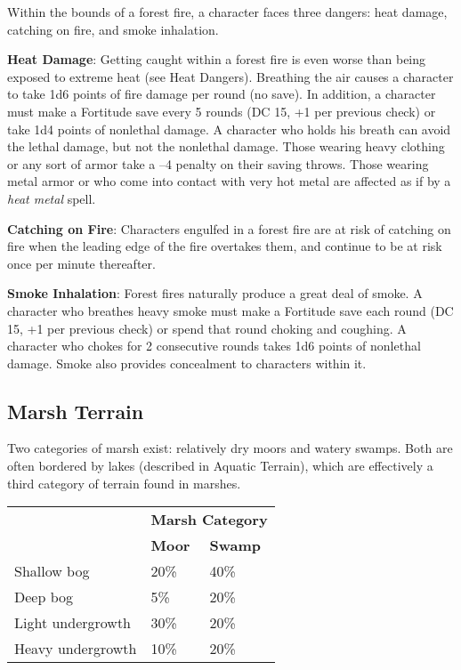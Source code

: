Within the bounds of a forest fire, a character faces three dangers: heat damage, catching on fire, and smoke inhalation. 
				
\textbf{Heat Damage}: Getting caught within a forest fire is even worse than being exposed to extreme heat (see Heat Dangers). Breathing the air causes a character to take 1d6 points of fire damage per round (no save). In addition, a character must make a Fortitude save every 5 rounds (DC 15, +1 per previous check) or take 1d4 points of nonlethal damage. A character who holds his breath can avoid the lethal damage, but not the nonlethal damage. Those wearing heavy clothing or any sort of armor take a --4 penalty on their saving throws. Those wearing metal armor or who come into contact with very hot metal are affected as if by a \textit{heat metal }spell.
				
\textbf{Catching on Fire}: Characters engulfed in a forest fire are at risk of catching on fire when the leading edge of the fire overtakes them, and continue to be at risk once per minute thereafter.
				
\textbf{Smoke Inhalation}: Forest fires naturally produce a great deal of smoke. A character who breathes heavy smoke must make a Fortitude save each round (DC 15, +1 per previous check) or spend that round choking and coughing. A character who chokes for 2 consecutive rounds takes 1d6 points of nonlethal damage. Smoke also provides concealment to characters within it.
				
\subsection{Marsh Terrain}

				
Two categories of marsh exist: relatively dry moors and watery swamps. Both are often bordered by lakes (described in Aquatic Terrain), which are effectively a third category of terrain found in marshes.

\begin{tabular}{lll}
 & \multicolumn{2}{c}{\textbf{Marsh Category}} \\
 & \textbf{Moor} & \textbf{Swamp} \\
Shallow bog & 20\% & 40\% \\
Deep bog & 5\% & 20\%\\
Light undergrowth & 30\% & 20\%\\
Heavy undergrowth & 10\% & 20\%\\
\end{tabular}
				
